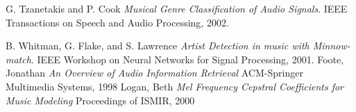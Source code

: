 \documentclass[twocolumn]{article}
\begin{document}
\begin{thebibliography}{9}

	G. Tzanetakis and P. Cook
	\emph{Musical Genre Classification of Audio Signals}.
	IEEE Transactions on Speech and Audio Processing,
	2002.

	B. Whitman, G. Flake, and S. Lawrence
	\emph{Artist Detection in music with Minnow-match}.
	IEEE Workshop on Neural Networks for Signal Processing,
	2001.
	Foote, Jonathan
	\emph{An Overview of Audio Information Retrieval}
	ACM-Springer Multimedia Systems,
	1998
	Logan, Beth
	\emph{Mel Frequency Cepstral Coefficients for Music Modeling}
	Proceedings of ISMIR,
	2000

\end{thebibliography}
\end{document}
